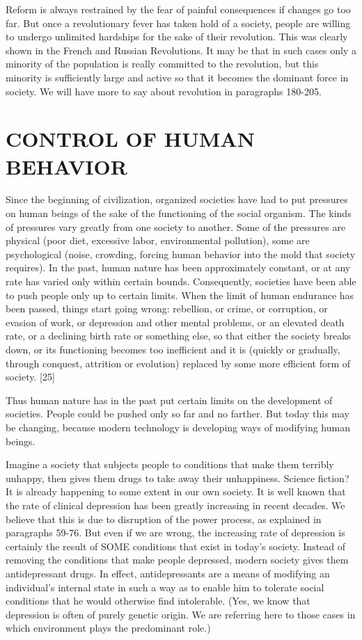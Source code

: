  Reform is always restrained by the fear of painful consequences if changes go too far. But once a revolutionary fever has taken hold of a society, people are willing to undergo unlimited hardships for the sake of their revolution. This was clearly shown in the French and Russian Revolutions. It may be that in such cases only a minority of the population is really committed to the revolution, but this minority is sufficiently large and active so that it becomes the dominant force in society. We will have more to say about revolution in paragraphs 180-205.

\chapter{CONTROL OF HUMAN BEHAVIOR}

 Since the beginning of civilization, organized societies have had to put pressures on human beings of the sake of the functioning of the social organism. The kinds of pressures vary greatly from one society to another. Some of the pressures are physical (poor diet, excessive labor, environmental pollution), some are psychological (noise, crowding, forcing human behavior into the mold that society requires). In the past, human nature has been approximately constant, or at any rate has varied only within certain bounds. Consequently, societies have been able to push people only up to certain limits. When the limit of human endurance has been passed, things start going wrong: rebellion, or crime, or corruption, or evasion of work, or depression and other mental problems, or an elevated death rate, or a declining birth rate or something else, so that either the society breaks down, or its functioning becomes too inefficient and it is (quickly or gradually, through conquest, attrition or evolution) replaced by some more efficient form of society. [25]

 Thus human nature has in the past put certain limits on the development of societies. People could be pushed only so far and no farther. But today this may be changing, because modern technology is developing ways of modifying human beings.

 Imagine a society that subjects people to conditions that make them terribly unhappy, then gives them drugs to take away their unhappiness. Science fiction? It is already happening to some extent in our own society. It is well known that the rate of clinical depression has been greatly increasing in recent decades. We believe that this is due to disruption of the power process, as explained in paragraphs 59-76. But even if we are wrong, the increasing rate of depression is certainly the result of SOME conditions that exist in today’s society. Instead of removing the conditions that make people depressed, modern society gives them antidepressant drugs. In effect, antidepressants are a means of modifying an individual’s internal state in such a way as to enable him to tolerate social conditions that he would otherwise find intolerable. (Yes, we know that depression is often of purely genetic origin. We are referring here to those cases in which environment plays the predominant role.)

